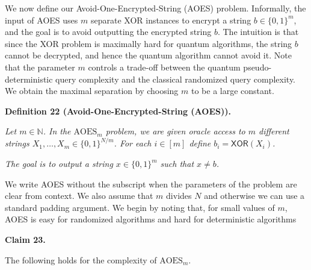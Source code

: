 \documentclass[10pt,a4paper]{article}
\begin{document}
We now define our Avoid-One-Encrypted-String (AOES) problem.
Informally, the input of AOES uses $m$ separate XOR instances to encrypt a string $b\in\{0,1\}^{m}$, and the goal is to avoid outputting the encrypted string $b$. The intuition is that since the XOR problem is maximally hard for quantum algorithms, the string $b$ cannot be decrypted, and hence the quantum algorithm cannot avoid it.
Note that the parameter $m$ controls a trade-off between the quantum pseudo-deterministic query complexity and the classical randomized query complexity. We obtain the maximal separation by choosing $m$ to be a large constant.\par





\par\medskip\noindent\textbf{
\textbf{Definition 22}\textbf{ }(Avoid-One-Encrypted-String (AOES))\textbf{.}
}\par



\emph{Let $m\in\mathbb{N}$. In the ${\text{AOES}}_{m}$ problem, we are given oracle access to $m$ different strings $X_{1},\ldots,X_{m}\in\{0,1\}^{N/m}$. For each $i\in[m]$ define $b_{i}=\mathsf{XOR}(X_{i})$.}\par




\emph{The goal is to output a string $x\in\{0,1\}^{m}$ such that $x\neq b$.}\par






We write AOES without the subscript when the parameters of the problem are clear from context. We also assume that $m$ divides $N$ and otherwise we can use a standard padding argument. We begin by noting that, for small values of $m$, AOES is easy for randomized algorithms and hard for deterministic algorithms\par





\par\medskip\noindent\textbf{
Claim 23. 
}\par



The following holds for the complexity of ${\text{AOES}}_{m}$.\par
\end{document}
